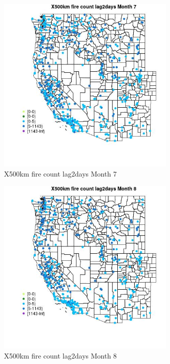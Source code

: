 \begin{figure} 
\centering  
\includegraphics[width=0.77\textwidth]{Code_Outputs/Report_ML_input_PM25_Step4_part_e_de_duplicated_aves_compiled_2019-05-14wNAs_MapObsMo7X500km_fire_count_lag2days.jpg} 
\caption{\label{fig:Report_ML_input_PM25_Step4_part_e_de_duplicated_aves_compiled_2019-05-14wNAsMapObsMo7X500km_fire_count_lag2days}X500km fire count lag2days Month 7} 
\end{figure} 
 

\begin{figure} 
\centering  
\includegraphics[width=0.77\textwidth]{Code_Outputs/Report_ML_input_PM25_Step4_part_e_de_duplicated_aves_compiled_2019-05-14wNAs_MapObsMo8X500km_fire_count_lag2days.jpg} 
\caption{\label{fig:Report_ML_input_PM25_Step4_part_e_de_duplicated_aves_compiled_2019-05-14wNAsMapObsMo8X500km_fire_count_lag2days}X500km fire count lag2days Month 8} 
\end{figure} 
 

